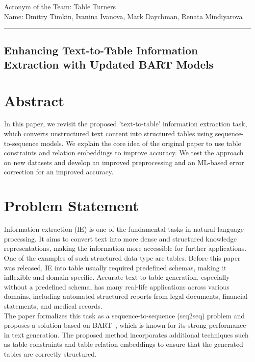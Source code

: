 \documentclass[12pt,a4paper]{article}
\begin{document}
\noindent Acronym of the Team: Table Turners\\
Name:	Dmitry Timkin, Ivanina Ivanova, Mark Daychman, Renata Mindiyarova

{\centering\rule{\linewidth}{.5pt}}


\begin{center}
\section*{Enhancing Text-to-Table Information Extraction with Updated BART Models}
\end{center}
\section*{Abstract}
In this paper, we revisit the proposed 'text-to-table' information extraction task, which converts unstructured text content into structured tables using sequence-to-sequence models. We explain the core idea of the original paper \cite{wu2022texttotablenewwayinformation} to use table constraints and relation embeddings to improve accuracy. We test the approach on new datasets and develop an improved preprocessing and an ML-based error correction for an improved accuracy. 

\section*{Problem Statement}
Information extraction (IE) is one of the fundamental tasks in natural language processing. It aims to convert text into more dense and structured knowledge representations, making the information more accessible for further applications. One of the examples of such structured data type are tables. Before this paper was released, IE into table usually required predefined schemas, making it inflexible and domain specific. Accurate text-to-table generation, especially without a predefined schema, has many real-life applications across various domains, including automated structured reports from legal documents, financial statements, and medical records. 
\ \\

The paper formalizes this task as a sequence-to-sequence (seq2seq) problem and proposes a solution based on BART~\cite{lewis2019bart}, which is known for its strong performance in text generation. The proposed method incorporates additional techniques such as table constraints and table relation embeddings to ensure that the generated tables are correctly structured. 
\ \\
\end{document}
